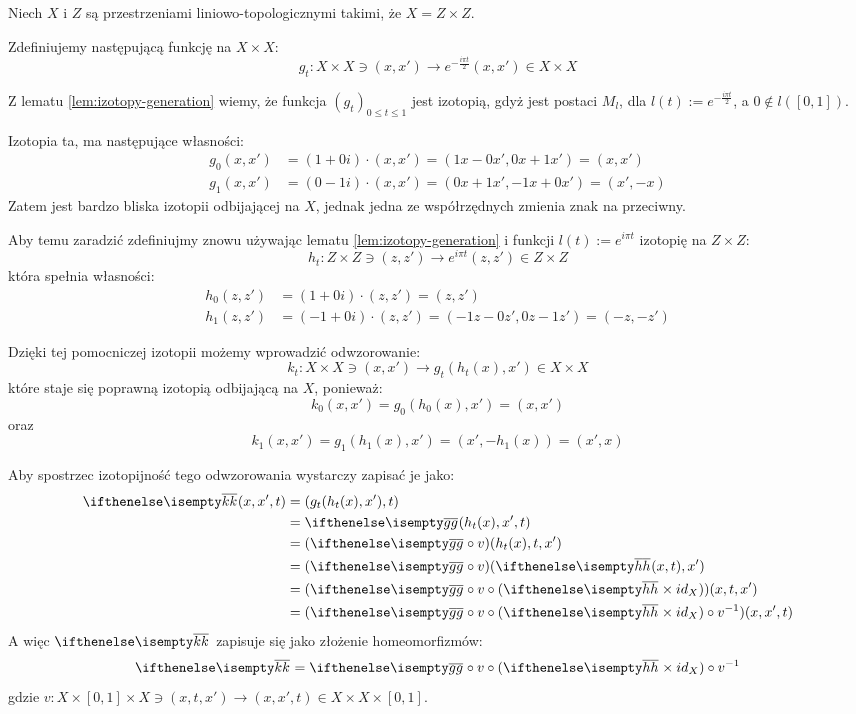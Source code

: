 \begin{ex}
  Niech $X$ i $Z$ są przestrzeniami liniowo-topologicznymi takimi, że $X = Z \times Z$.
  
  Zdefiniujemy następującą funkcję na $X \times X$:
  \[
    g_t: X \times X \ni (x,x') \to e^{-\frac{i \pi t}{2}} (x, x') \in X \times X
  \]
  
  Z lematu \ref{lem:izotopy-generation} wiemy, że funkcja $(g_t)_{0 \leq t \leq 1}$ jest izotopią, gdyż jest postaci $M_l$, dla $l(t) := e^{-\frac{i \pi t}{2}}$, a $0 \not\in l([0,1])$.
  
  Izotopia ta, ma następujące własności:
  \begin{align*}
    g_0(x,x') &= (1+0i) \cdot (x,x') = (1x-0x',0x+1x') = (x,x') \\
    g_1(x,x') &= (0-1i) \cdot (x,x') = (0x+1x',-1x+0x') = (x', -x)
  \end{align*}
  Zatem jest bardzo bliska izotopii odbijającej na $X$, jednak jedna ze współrzędnych zmienia znak na przeciwny.
  
  Aby temu zaradzić zdefiniujmy znowu używając lematu \ref{lem:izotopy-generation} i funkcji $l(t) := e^{i \pi t}$ izotopię na $Z \times Z$:
  \[
    h_t: Z \times Z \ni (z,z') \to e^{i \pi t}(z, z') \in Z \times Z
  \]
  która spełnia własności:
  \begin{align*}
    h_0(z,z') &= (1+0i) \cdot (z,z') = (z,z') \\
    h_1(z,z') &= (-1+0i) \cdot (z,z') = (-1z-0z', 0z-1z') = (-z,-z')
  \end{align*}
  
  Dzięki tej pomocniczej izotopii możemy wprowadzić odwzorowanie:
  \[k_t: X \times X \ni (x, x') \rightarrow g_t(h_t(x), x') \in X \times X\]
  które staje się poprawną izotopią odbijającą na $X$, ponieważ:
  \[k_0(x,x') = g_0(h_0(x), x') = (x, x')\]
  oraz
  \[k_1(x,x') = g_1(h_1(x), x') = (x', -h_1(x)) = (x', x)\]
  
  Aby spostrzec izotopijność tego odwzorowania wystarczy zapisać je jako:
  \begin{align*}
    \cl{k}(x,x',t) &= (g_t(h_t(x), x'), t) \\
    &= \cl{g}(h_t(x), x', t) \\
    &= (\cl{g} \circ v)(h_t(x), t, x') \\
    &= (\cl{g} \circ v)(\cl{h}(x,t), x') \\
    &= (\cl{g} \circ v \circ (\cl{h} \times id_X))(x,t,x') \\
    &= (\cl{g} \circ v \circ (\cl{h} \times id_X) \circ v^{-1})(x,x',t)
  \end{align*}
  A więc $\cl{k}$ zapisuje się jako złożenie homeomorfizmów:
  \[\cl{k} = \cl{g} \circ v \circ (\cl{h} \times id_X) \circ v^{-1}\]
  gdzie $v: X \times [0,1] \times X \ni (x, t, x') \rightarrow (x, x', t) \in X \times X \times [0,1]$.
  
\end{ex}
